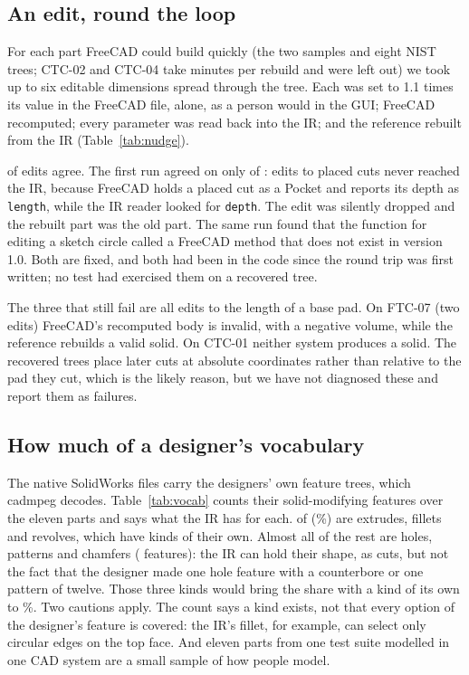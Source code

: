 \documentclass[11pt]{article}
\newcommand{\code}[1]{\texttt{\small #1}}
\begin{document}
\subsection{An edit, round the loop}\label{sec:nudge}

For each part FreeCAD could build quickly (the two samples and eight NIST trees;
CTC-02 and CTC-04 take minutes per rebuild and were left out) we took up to six
editable dimensions spread through the tree. Each was set to 1.1 times its value
in the FreeCAD file, alone, as a person would in the GUI; FreeCAD recomputed;
every parameter was read back into the IR; and the reference rebuilt from the
IR (Table~\ref{tab:nudge}).

\NudgeAgree{} of \NudgeTried{} edits agree. The first run agreed on only
\NudgeBeforeAgree{} of \NudgeBeforeTried{}: \NudgeBeforeLost{} edits to placed
cuts never reached the IR, because FreeCAD holds a placed cut as a Pocket and
reports its depth as \code{length}, while the IR reader looked for \code{depth}.
The edit was silently dropped and the rebuilt part was the old part. The same
run found that the function for editing a sketch circle called a FreeCAD method
that does not exist in version 1.0. Both are fixed, and both had been in the
code since the round trip was first written; no test had exercised them on a
recovered tree.

The three that still fail are all edits to the length of a base pad. On FTC-07
(two edits) FreeCAD's recomputed body is invalid, with a negative volume, while
the reference rebuilds a valid solid. On CTC-01 neither system produces a solid.
The recovered trees place later cuts at absolute coordinates rather than
relative to the pad they cut, which is the likely reason, but we have not
diagnosed these and report them as failures.

\subsection{How much of a designer's vocabulary}\label{sec:vocab}

The native SolidWorks files carry the designers' own feature trees, which cadmpeg
decodes. Table~\ref{tab:vocab} counts their solid-modifying features over the
eleven parts and says what the IR has for each. \VocabKind{} of \VocabTotal{}
(\VocabKindPct\%) are extrudes, fillets and revolves, which have kinds of their
own. Almost all of the rest are holes, patterns and chamfers
(\VocabNext{} features): the IR can hold their shape, as cuts, but not the fact
that the designer made one hole feature with a counterbore or one pattern of
twelve. Those three kinds would bring the share with a kind of its own to
\VocabNextPct\%. Two cautions apply. The count says a kind exists, not that every
option of the designer's feature is covered: the IR's fillet, for example, can
select only circular edges on the top face. And eleven parts from one test suite
modelled in one CAD system are a small sample of how people model.
\end{document}
